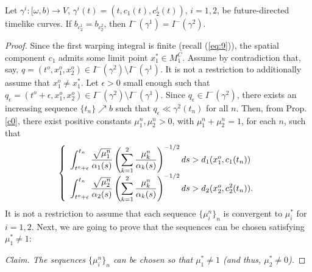 \begin{lemma}\label{lemma:aux2}

Let $\gamma^i:[\omega,b)\rightarrow V$, $\gamma^i(t)=(t,c_1(t),c_2^i(t))$, $i=1,2$, be future-directed timelike curves. If $b_{c_2^1}=b_{c_2^2}$, then $I^-(\gamma^1)=I^-(\gamma^2)$.
\end{lemma}
\begin{proof}
Since the first warping integral is finite (recall (\ref{eq:9})), the spatial component $c_1$ admits some limit point $x_1^*\in M_1^C$. Assume by contradiction that, say, $q=(t^o,x_1^o,x_2^o)\in I^-(\gamma^2)\setminus I^-(\gamma^1)$. It is not a restriction to additionally assume that $x_1^o\neq x_1^*$. Let $\epsilon>0$ small enough such that $q_\epsilon=(t^o+\epsilon,x_1^o,x_2^o)\in I^-(\gamma^2)\setminus I^-(\gamma^1)$. Since $q_\epsilon\in I^-(\gamma^2)$, there exists an increasing sequence $\{t_n\}\nearrow b$ such that $q_\epsilon\ll \gamma^2(t_n)$ for all $n$. Then, from  Prop. \ref{c0}, there exist positive constants $\mu_1^n, \mu_2^n >0$, with $\mu_1^n+\mu_2^n=1$, for each $n$, such that
  \begin{equation}\label{eq*}
    \left\{\begin{array}{l}
    \displaystyle  \int_{t^o+\epsilon}^{t_n} \frac{\sqrt{\mu^n_{1}}}{\alpha_{1}(s)}\left(\sum_{k=1}^{2} \frac{\mu^n_{k}}{\alpha_{k}(s)} \right)^{-1/2}ds>
             d_{1}(x^o_{1},c_{1}(t_n))\\
\displaystyle\int_{t^o+\epsilon}^{t_n} \frac{\sqrt{\mu^n_{2}}}{\alpha_{2}(s)}\left(\sum_{k=1}^{2} \frac{\mu^n_{k}}{\alpha_{k}(s)} \right)^{-1/2}ds>
             d_{2}(x^o_{2},c^2_{2}(t_n)).
    \end{array}\right.
    \end{equation}
    It is not a restriction to assume that each sequence $\{\mu^n_i\}_n$ is convergent to $\mu_i^*$ for $i=1,2$. Next, we are going to prove that the sequences can be chosen satisfying $\mu_{1}^{*} \neq 1$:


   \smallskip

{\em Claim. The sequences $\{\mu^n_i\}_n$  can be chosen so that $\mu_1^*\neq 1$ (and thus, $\mu_2^*\neq 0$).}


  \smallskip



\end{proof}
